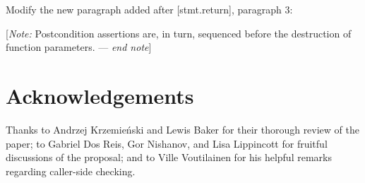 Modify the new paragraph added after [stmt.return], paragraph 3:

\begin{adjustwidth}{0.5cm}{0.5cm}

[\emph{Note:} Postcondition assertions are, in turn, sequenced before the destruction of function parameters. --- \emph{end note}]

\end{adjustwidth}


\section*{Acknowledgements}
Thanks to Andrzej Krzemie\' nski and Lewis Baker for their thorough review of the paper; to Gabriel Dos Reis, Gor Nishanov, and Lisa Lippincott for fruitful discussions of the proposal; and to Ville Voutilainen for his helpful remarks regarding caller-side checking.


\renewcommand{\addcontentsline}[3]{}%







